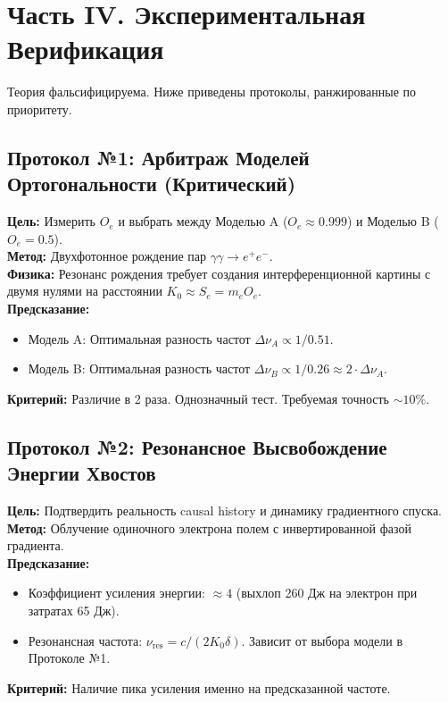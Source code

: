 \documentclass[12pt,a4paper]{article}
\begin{document}
\section{Часть IV. Экспериментальная Верификация}

Теория фальсифицируема. Ниже приведены протоколы, ранжированные по приоритету.

\subsection{Протокол №1: Арбитраж Моделей Ортогональности (Критический)}
\textbf{Цель:} Измерить $O_e$ и выбрать между Моделью A ($O_e \approx 0.999$) и Моделью B ($O_e = 0.5$).\\
\textbf{Метод:} Двухфотонное рождение пар $\gamma\gamma \to e^+e^-$.\\
\textbf{Физика:} Резонанс рождения требует создания интерференционной картины с двумя нулями на расстоянии $K_0 \approx S_e = m_e O_e$.\\
\textbf{Предсказание:}
\begin{itemize}
    \item Модель A: Оптимальная разность частот $\Delta \nu_A \propto 1/0.51$.
    \item Модель B: Оптимальная разность частот $\Delta \nu_B \propto 1/0.26 \approx 2 \cdot \Delta \nu_A$.
\end{itemize}
\textbf{Критерий:} Различие в 2 раза. Однозначный тест. Требуемая точность $\sim 10\%$.

\subsection{Протокол №2: Резонансное Высвобождение Энергии Хвостов}
\textbf{Цель:} Подтвердить реальность causal history и динамику градиентного спуска.\\
\textbf{Метод:} Облучение одиночного электрона полем с инвертированной фазой градиента.\\
\textbf{Предсказание:}
\begin{itemize}
    \item Коэффициент усиления энергии: $\approx 4$ (выхлоп 260 Дж на электрон при затратах 65 Дж).
    \item Резонансная частота: $\nu_{\text{res}} = c / (2 K_0 \delta)$. Зависит от выбора модели в Протоколе №1.
\end{itemize}
\textbf{Критерий:} Наличие пика усиления именно на предсказанной частоте.
\end{document}
